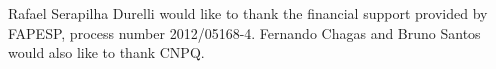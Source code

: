 Rafael Serapilha Durelli would like to thank the financial support provided by FAPESP, process number 2012/05168-4. Fernando Chagas and Bruno Santos would also like to thank CNPQ.